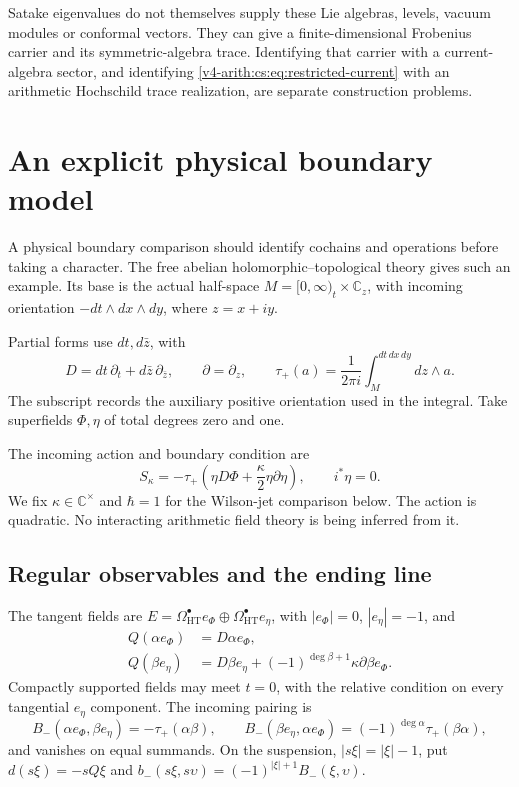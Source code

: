 Satake eigenvalues do not themselves supply these Lie algebras, levels,
vacuum modules or conformal vectors. They can give a finite-dimensional
Frobenius carrier and its symmetric-algebra trace. Identifying that carrier
with a current-algebra sector, and identifying
\eqref{v4-arith:cs:eq:restricted-current} with an arithmetic Hochschild
trace realization, are separate construction problems.

\section{An explicit physical boundary model}
\label{v4-arith:cs:physical}

A physical boundary comparison should identify cochains and operations
before taking a character. The free abelian holomorphic--topological theory
gives such an example. Its base is the actual half-space
\(M=[0,\infty)_t\times\mathbb C_z\), with incoming orientation \(-dt\wedge
dx\wedge dy\), where \(z=x+iy\).

Partial forms use \(dt,d\bar z\), with
\[
 D=dt\,\partial_t+d\bar z\,\partial_{\bar z},\qquad
 \partial=\partial_z,
 \qquad
 \tau_+(a)=\frac1{2\pi i}\int_M^{dt\,dx\,dy}dz\wedge a.
\]
The subscript records the auxiliary positive orientation used in the
integral. Take superfields \(\Phi,\eta\) of total degrees zero and one.

The incoming action and boundary condition are
\begin{equation}
 S_\kappa=-\tau_+\left(\eta D\Phi+
                            \frac\kappa2\eta\partial\eta\right),
 \qquad i^*\eta=0.
 \label{v4-arith:cs:eq:physical-action}
\end{equation}
We fix \(\kappa\in\mathbb C^\times\) and \(\hbar=1\) for the Wilson-jet
comparison below. The action is quadratic. No interacting arithmetic field
theory is being inferred from it.

\subsection{Regular observables and the ending line}

The tangent fields are \(E=\Omega_{\mathrm{HT}}^\bullet e_\Phi
\oplus\Omega_{\mathrm{HT}}^\bullet e_\eta\), with \(|e_\Phi|=0\),
\(|e_\eta|=-1\), and
\begin{align*}
 Q(\alpha e_\Phi)&=D\alpha e_\Phi,\\
 Q(\beta e_\eta)&=D\beta e_\eta+
                  (-1)^{\deg\beta+1}\kappa\partial\beta e_\Phi.
\end{align*}
Compactly supported fields may meet \(t=0\), with the relative condition on
every tangential \(e_\eta\) component. The incoming pairing is
\[
 B_-(\alpha e_\Phi,\beta e_\eta)=-\tau_+(\alpha\beta),
 \qquad
 B_-(\beta e_\eta,\alpha e_\Phi)
                    =(-1)^{\deg\alpha}\tau_+(\beta\alpha),
\]
and vanishes on equal summands. On the suspension, \(|s\xi|=|\xi|-1\), put
\(d(s\xi)=-sQ\xi\) and
\(b_-(s\xi,s\upsilon)=(-1)^{|\xi|+1}B_-(\xi,\upsilon)\).

